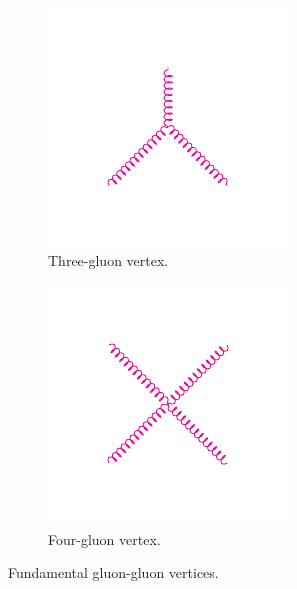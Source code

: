 \begin{figure}[htbp]
  \centering
  \begin{subfigure}{0.45\textwidth}
    \centering
    \includegraphics[width=\textwidth]{qcd_3gluon}
    \caption{Three-gluon vertex.}
    \label{fig:qcd_3gluon}
  \end{subfigure}
  \begin{subfigure}{0.45\textwidth}
    \centering
    \includegraphics[width=\textwidth]{qcd_4gluon}
    \caption{Four-gluon vertex.}
    \label{fig:qcd_4gluon}
  \end{subfigure}
  \caption{Fundamental gluon-gluon vertices.}\label{fig:qcd_gluon} 
\end{figure}

